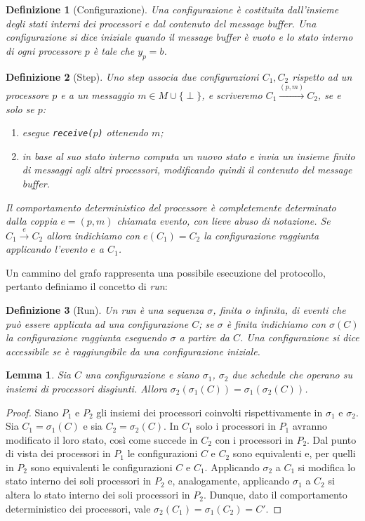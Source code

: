 \documentclass{article}
\newtheorem{definizione}{Definizione}
\newtheorem{lemma}{Lemma}
\begin{document}
\begin{definizione}[Configurazione]
  Una \emph{configurazione} \`e costituita dall'insieme degli stati
  interni dei processori e dal contenuto del message buffer. Una
  configurazione si dice iniziale quando il message buffer è vuoto e
  lo stato interno di ogni processore $p$ è tale che $y_p = b$.
\end{definizione}

\begin{definizione}[Step]
  Uno \emph{step} associa due configurazioni $C_1, C_2$ rispetto ad un
  processore $p$ e a un messaggio $m \in M\cup\{\perp\}$, e
  scriveremo $C_1 \xrightarrow{(p,m)} C_2$, se e solo
  se $p$:
  \begin{enumerate}
  \item esegue \texttt{receive($p$)} ottenendo $m$;
  \item in base al suo stato interno computa un nuovo stato e invia un
    insieme finito di messaggi agli altri processori, modificando
    quindi il contenuto del message buffer.
  \end{enumerate} 
  Il comportamento deterministico del processore è completemente
  determinato dalla coppia $e=(p,m)$ chiamata evento, con lieve abuso
  di notazione. Se $C_1 \xrightarrow{e} C_2$ allora indichiamo con
  $e(C_1)=C_2$ la configurazione raggiunta applicando l'evento $e$ a
  $C_1$.
\end{definizione}

Un cammino del grafo rappresenta una possibile esecuzione del
protocollo, pertanto definiamo il concetto di \emph{run}:

\begin{definizione}[Run]
  Un \emph{run} è una sequenza $\sigma$, finita o infinita, di eventi
  che può essere applicata ad una configurazione $C$; se $\sigma$ è
  finita indichiamo con $\sigma(C)$ la configurazione raggiunta
  eseguendo $\sigma$ a partire da $C$. Una configurazione si dice
  \emph{accessibile} se \`e raggiungibile da una configurazione
  iniziale.
\end{definizione}

\begin{lemma}
Sia $C$ una configurazione e siano $\sigma_1$, $\sigma_2$ due schedule che operano su insiemi di processori disgiunti. Allora $\sigma_2(\sigma_1(C))=\sigma_1(\sigma_2(C))$. 
\end{lemma}

\begin{proof}
Siano $P_1$ e $P_2$ gli insiemi dei processori coinvolti rispettivamente in $\sigma_1$ e $\sigma_2$. Sia $C_1=\sigma_1(C)$ e sia $C_2=\sigma_2(C)$. In $C_1$ solo i processori in $P_1$ avranno modificato il loro stato, così come succede in $C_2$ con i processori in $P_2$. Dal punto di vista dei processori in $P_1$ le configurazioni $C$ e $C_2$ sono equivalenti e, per quelli in $P_2$ sono equivalenti le configurazioni $C$ e $C_1$. Applicando $\sigma_2$ a $C_1$ si modifica lo stato interno dei soli processori in $P_2$ e, analogamente, applicando $\sigma_1$ a $C_2$ si altera lo stato interno dei soli processori in $P_2$. Dunque, dato il comportamento deterministico dei processori, vale $\sigma_2(C_1)=\sigma_1(C_2)=C'$.     
\end{proof}
\end{document}
